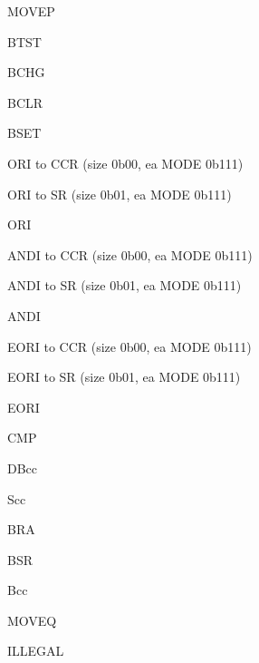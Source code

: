 
\begin{DoxyRefList}
\item[\label{todo__todo000001}%
\hypertarget{todo__todo000001}{}%
Member \hyperlink{classcom_1_1wmbest_1_1jenesis_1_1m68k_1_1instructions_1_1BitwiseInstruction_a79df961b77eeae4ef50ebc9990a3d55c}{com.wmbest.jenesis.m68k.instructions.Bitwise\-Instruction.get\-Instruction} (int value)]M\-O\-V\-E\-P 

B\-T\-S\-T 

B\-C\-H\-G 

B\-C\-L\-R 

B\-S\-E\-T  
\item[\label{todo__todo000006}%
\hypertarget{todo__todo000006}{}%
Member \hyperlink{classcom_1_1wmbest_1_1jenesis_1_1m68k_1_1instructions_1_1ImmediateInstruction_a5ad9ecb37c716bc4d8e877fa9fae76d8}{com.wmbest.jenesis.m68k.instructions.Immediate\-Instruction.get\-Instruction} (int value)]O\-R\-I to C\-C\-R (size 0b00, ea M\-O\-D\-E 0b111) 

O\-R\-I to S\-R (size 0b01, ea M\-O\-D\-E 0b111) 

O\-R\-I 

A\-N\-D\-I to C\-C\-R (size 0b00, ea M\-O\-D\-E 0b111) 

A\-N\-D\-I to S\-R (size 0b01, ea M\-O\-D\-E 0b111) 

A\-N\-D\-I 

E\-O\-R\-I to C\-C\-R (size 0b00, ea M\-O\-D\-E 0b111) 

E\-O\-R\-I to S\-R (size 0b01, ea M\-O\-D\-E 0b111) 

E\-O\-R\-I 

C\-M\-P  
\item[\label{todo__todo000016}%
\hypertarget{todo__todo000016}{}%
Member \hyperlink{classcom_1_1wmbest_1_1jenesis_1_1m68k_1_1instructions_1_1QuickAndBranchInstruction_a926e056f81d08cc66c893fcce53bce6a}{com.wmbest.jenesis.m68k.instructions.Quick\-And\-Branch\-Instruction.get\-Instruction} (int value)]D\-Bcc 

Scc 

B\-R\-A 

B\-S\-R 

Bcc 

M\-O\-V\-E\-Q  
\item[\label{todo__todo000022}%
\hypertarget{todo__todo000022}{}%
Member \hyperlink{classcom_1_1wmbest_1_1jenesis_1_1m68k_1_1instructions_1_1SystemInstruction_a3a02281c96164bd836be2eca75873c07}{com.wmbest.jenesis.m68k.instructions.System\-Instruction.get\-Instruction} (int value)]I\-L\-L\-E\-G\-A\-L 


\end{DoxyRefList}
